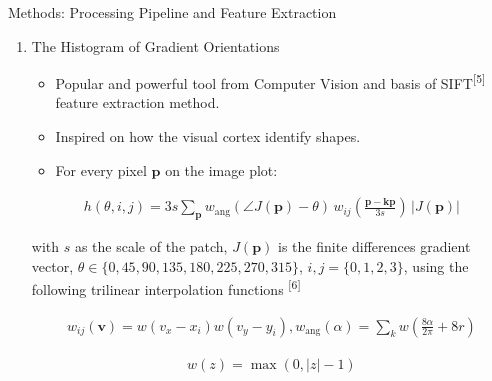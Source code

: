 \documentclass[final,hyperref={pdfpagelabels=false}]{beamer}
\begin{document}
\begin{frame}[t]
\begin{columns}[t]
\begin{column}{.465\textwidth}
\begin{block}{Methods: Processing Pipeline and Feature Extraction}
\begin{enumerate}
\begin{figure}[htb]
\caption{Sample patch around a signal complex. The patch is divided in $4 \times 4$ blocks and $8$ orientations (bins) are calculated on each block, forming a $128$ normalized feature called \textit{descriptor}.}
\label{fig:histogramof}
\end{figure}


\item The Histogram of Gradient Orientations
\begin{itemize}
\item Popular and powerful tool from Computer Vision and basis of SIFT\textsuperscript{[5]} feature extraction method.
\item Inspired on how the visual cortex identify shapes.
\item For every pixel $\mathbf{p}$ on the image plot:
\end{itemize}

\begin{align*}
 h(\theta,i,j) = 3 s \sum_{\mathbf{p}} w_\mathrm{ang}(\angle J(\mathbf{p}) - \theta)\, w_{ij}\left(\frac{\mathbf{p} - \mathbf{kp}}{3 s}\right)\, |J(\mathbf{p})|
\end{align*}

\noindent with $s$ as the scale of the patch, $J(\mathbf{p})$ is the finite differences gradient vector, $ \theta \in \{0, 45, 90, 135, 180, 225, 270, 315\} $, $ i,j = \{0,1,2,3\} $, using the following trilinear interpolation functions \textsuperscript{[6]}

\begin{align*}
 w_{ij}(\mathbf{v}) = w( v_x - x_i ) w( v_y - y_i ) ,  w_\mathrm{ang}(\alpha) = \sum_{k} w( \frac{8\alpha}{2\pi} + 8r)
\end{align*}

\begin{align*}
 w(z) = \max(0,|z|-1)
\end{align*}


\end{enumerate}

\end{block}




\end{column} %


\end{columns}
\end{frame}
\end{document}
